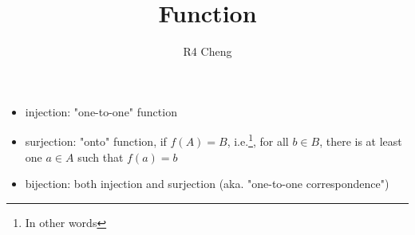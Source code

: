 \documentclass[12pt,a4paper]{article}
\title{Function}
\author{R4 Cheng}
\date{}
\begin{document}
\maketitle

\begin{itemize}
  \item injection: "one-to-one" function
  \item surjection: "onto" function, if $ f(A) = B $, i.e.\footnote{In other words}, for all $b \in B$, there is at least one $a \in A$ such that $f(a) = b$
  \item bijection: both injection and surjection (aka. "one-to-one correspondence")
\end{itemize}
\end{document}
